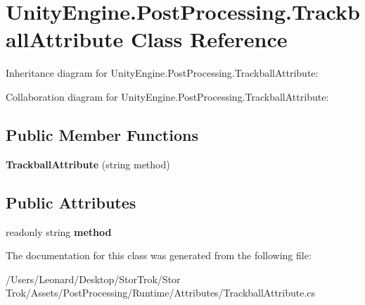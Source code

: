 \hypertarget{class_unity_engine_1_1_post_processing_1_1_trackball_attribute}{}\section{Unity\+Engine.\+Post\+Processing.\+Trackball\+Attribute Class Reference}
\label{class_unity_engine_1_1_post_processing_1_1_trackball_attribute}


Inheritance diagram for Unity\+Engine.\+Post\+Processing.\+Trackball\+Attribute\+:


Collaboration diagram for Unity\+Engine.\+Post\+Processing.\+Trackball\+Attribute\+:
\subsection*{Public Member Functions}
\begin{DoxyCompactItemize}
\item 
\mbox{\label{class_unity_engine_1_1_post_processing_1_1_trackball_attribute_a52191c242795edb5e0a72fabaa9e5978}} 
{\bfseries Trackball\+Attribute} (string method)
\end{DoxyCompactItemize}
\subsection*{Public Attributes}
\begin{DoxyCompactItemize}
\item 
\mbox{\label{class_unity_engine_1_1_post_processing_1_1_trackball_attribute_a221e0ff9fe5396c91114a43ee8314616}} 
readonly string {\bfseries method}
\end{DoxyCompactItemize}


The documentation for this class was generated from the following file\+:\begin{DoxyCompactItemize}
\item 
/\+Users/\+Leonard/\+Desktop/\+Stor\+Trok/\+Stor Trok/\+Assets/\+Post\+Processing/\+Runtime/\+Attributes/Trackball\+Attribute.\+cs\end{DoxyCompactItemize}
